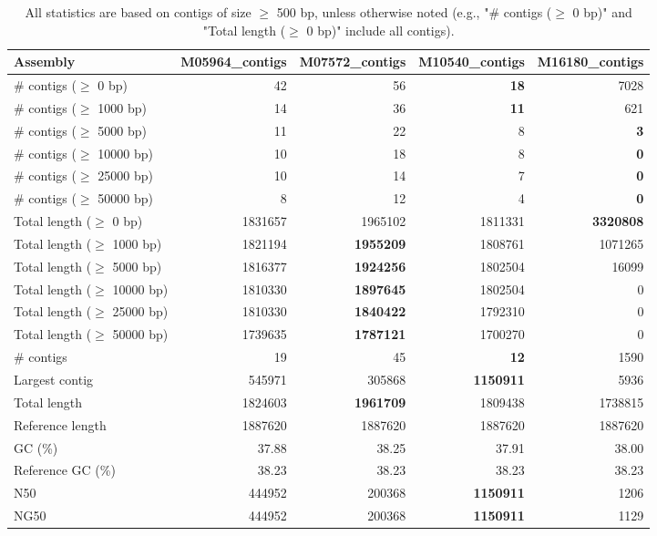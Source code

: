 \documentclass[12pt,a4paper]{article}
\begin{document}
\begin{table}[ht]
\begin{center}
\caption{All statistics are based on contigs of size $\geq$ 500 bp, unless otherwise noted (e.g., "\# contigs ($\geq$ 0 bp)" and "Total length ($\geq$ 0 bp)" include all contigs).}
\begin{tabular}{|l*{4}{|r}|}
\hline
Assembly & M05964\_contigs & M07572\_contigs & M10540\_contigs & M16180\_contigs \\ \hline
\# contigs ($\geq$ 0 bp) & 42 & 56 & {\bf 18} & 7028 \\ \hline
\# contigs ($\geq$ 1000 bp) & 14 & 36 & {\bf 11} & 621 \\ \hline
\# contigs ($\geq$ 5000 bp) & 11 & 22 & 8 & {\bf 3} \\ \hline
\# contigs ($\geq$ 10000 bp) & 10 & 18 & 8 & {\bf 0} \\ \hline
\# contigs ($\geq$ 25000 bp) & 10 & 14 & 7 & {\bf 0} \\ \hline
\# contigs ($\geq$ 50000 bp) & 8 & 12 & 4 & {\bf 0} \\ \hline
Total length ($\geq$ 0 bp) & 1831657 & 1965102 & 1811331 & {\bf 3320808} \\ \hline
Total length ($\geq$ 1000 bp) & 1821194 & {\bf 1955209} & 1808761 & 1071265 \\ \hline
Total length ($\geq$ 5000 bp) & 1816377 & {\bf 1924256} & 1802504 & 16099 \\ \hline
Total length ($\geq$ 10000 bp) & 1810330 & {\bf 1897645} & 1802504 & 0 \\ \hline
Total length ($\geq$ 25000 bp) & 1810330 & {\bf 1840422} & 1792310 & 0 \\ \hline
Total length ($\geq$ 50000 bp) & 1739635 & {\bf 1787121} & 1700270 & 0 \\ \hline
\# contigs & 19 & 45 & {\bf 12} & 1590 \\ \hline
Largest contig & 545971 & 305868 & {\bf 1150911} & 5936 \\ \hline
Total length & 1824603 & {\bf 1961709} & 1809438 & 1738815 \\ \hline
Reference length & 1887620 & 1887620 & 1887620 & 1887620 \\ \hline
GC (\%) & 37.88 & 38.25 & 37.91 & 38.00 \\ \hline
Reference GC (\%) & 38.23 & 38.23 & 38.23 & 38.23 \\ \hline
N50 & 444952 & 200368 & {\bf 1150911} & 1206 \\ \hline
NG50 & 444952 & 200368 & {\bf 1150911} & 1129 \\ \hline

\end{tabular}
\end{center}
\end{table}
\end{document}
